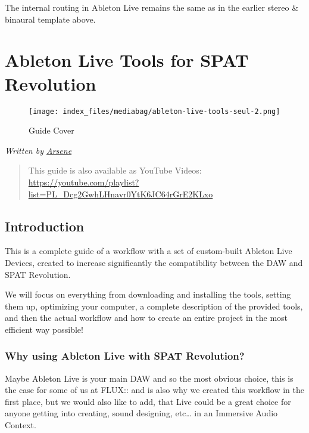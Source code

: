 \documentclass[
  letterpaper,
  DIV=11,
  numbers=noendperiod]{scrreport}
\begin{document}
The internal routing in Ableton Live remains the same as in the earlier
stereo \& binaural template above.

\hypertarget{ableton-live-tools-for-spat-revolution}{%
\chapter{Ableton Live Tools for SPAT
Revolution}\label{ableton-live-tools-for-spat-revolution}}

\begin{figure}

{\centering \texttt{[image: index\_files/mediabag/ableton-live-tools-seul-2.png]}

}

\caption{Guide Cover}

\end{figure}

\emph{Written by \href{https://www.flux.audio/contacts/arsene}{Arsene}}

\begin{quote}
This guide is also available as YouTube Videos:
\url{https://youtube.com/playlist?list=PL_Dcg2GwhLHnavr0YtK6JC64rGrE2KLxo}
\end{quote}

\hypertarget{introduction-3}{%
\section{Introduction}\label{introduction-3}}

This is a complete guide of a workflow with a set of custom-built
Ableton Live Devices, created to increase significantly the
compatibility between the DAW and SPAT Revolution.

We will focus on everything from downloading and installing the tools,
setting them up, optimizing your computer, a complete description of the
provided tools, and then the actual workflow and how to create an entire
project in the most efficient way possible!

\hypertarget{why-using-ableton-live-with-spat-revolution}{%
\subsection{Why using Ableton Live with SPAT
Revolution?}\label{why-using-ableton-live-with-spat-revolution}}

Maybe Ableton Live is your main DAW and so the most obvious choice, this
is the case for some of us at FLUX:: and is also why we created this
workflow in the first place, but we would also like to add, that Live
could be a great choice for anyone getting into creating, sound
designing, etc\ldots{} in an Immersive Audio Context.
\end{document}
